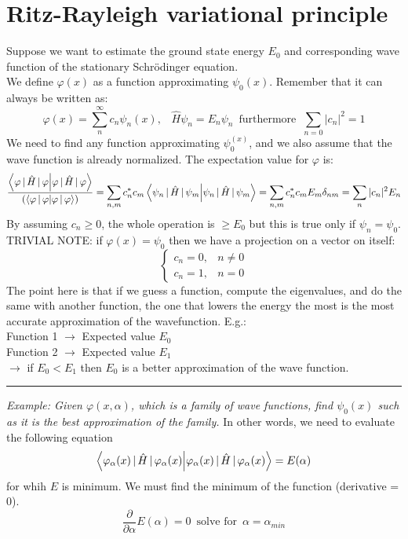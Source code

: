 \section{Ritz-Rayleigh variational principle}
Suppose we want to estimate the ground state energy $E_0$ and corresponding wave function of the stationary Schr\"{o}dinger equation.\\
We define $\varphi(x)$ as a function approximating $\psi_0(x)$.
Remember that it can always be written as:
\[
\varphi(x)=\sum_{n}^{\infty}c_n\psi_n(x),\;\;\; \hat{H}\psi_n=E_n\psi_n\, \text{ furthermore} \;\; \sum_{n=0}|c_n|^2=1
\]
We need to find any function approximating $\psi_0^{(x)}$, and we also assume that the wave function is already normalized.
The expectation value for $\varphi$ is:
\[
\frac{\braket{\varphi\,|\,\hat{H}\,|\,\varphi}}{(\braket{\varphi \,|\, \varphi})}=
\sum_{n,m}c_n^{*}c_m\braket{\psi_n\,|\,\hat{H}\,|\,\psi_m}=\sum_{n,m}c_n^{*}c_mE_m\delta_{nm}=
\sum_{n}|c_n|^2E_n
\]
By assuming $c_n \geq 0$, the whole operation is $\geq E_0$ but this is true only if $\psi_n=\psi_0$.\\
\newline
TRIVIAL NOTE: if $\varphi(x)=\psi_0$ then we have a projection on a vector on itself:
\[
\begin{cases}
c_n=0, & n \neq 0\\
c_n=1, & n=0
\end{cases}
\]
\newline
The point here is that if we guess a function, compute the eigenvalues, and do the same with another function, the one that lowers the energy the most is the most accurate approximation of the wavefunction.
E.g.:\\
Function 1 $\rightarrow$ Expected value $E_0$\\
Function 2 $\rightarrow$ Expected value $E_1$\\
$\rightarrow$ if $E_0 < E_1$ then $E_0$ is a better approximation of the wave function.\\
\newline
\noindent\rule{4cm}{0.1pt}
\newline
\textit{Example: Given $\varphi(x, \alpha)$, which is a family of wave functions, find $\psi_0(x)$ such as it is the best approximation of the family.} In other words, we need to evaluate the following equation\\
\[
\braket{\varphi_{\alpha}(x)\,|\,\hat{H}\,|\,\varphi_{\alpha}(x)}=E(\alpha)
\]
for whih $E$ is minimum.
We must find the minimum of the function (derivative = 0).
\[
\frac{\partial}{\partial\alpha}E(\alpha)=0\, \text{  solve for  }\, \alpha=\alpha_{min}
\]
